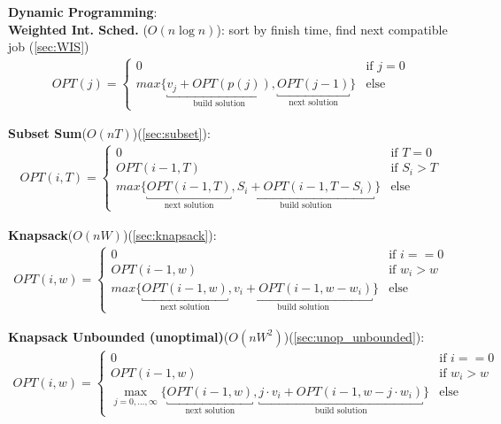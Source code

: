 \newpage 

\noindent
\textbf{Dynamic Programming}:\\

\noindent
\textbf{Weighted Int. Sched.} ($O(n\log n)$): sort by finish time, find next compatible job (\ref{sec:WIS})\\
 \begin{align*}
     OPT(j) =
    \begin{cases}
        0 & \text{if $j=0$}\\
        max\{\underbracket{v_j+OPT(p(j))}_{\text{build solution}}, \underbracket{OPT(j-1)}_{\text{next solution}}\} & \text{else}
    \end{cases}
\end{align*}

\noindent
\textbf{Subset Sum}($O(nT)$)(\ref{sec:subset}): 
\begin{align*}
    OPT(i, T) =
    \begin{cases}
        0 & \text{if $T=0$}\\
        OPT(i-1, T) & \text{if $S_i > T$}\\
        max\{\underbracket{OPT(i-1, T)}_{\text{next solution}}, \underbracket{S_i+OPT(i-1, T-S_i)}_{\text{build solution}}\} & \text{else}
    \end{cases}
\end{align*}

\noindent
\textbf{Knapsack}($O(nW)$)(\ref{sec:knapsack}):
\begin{align*}
    OPT(i, w) =
    \begin{cases}
        0 & \text{if $i==0$}\\
        OPT(i-1, w) & \text{if $w_i > w$}\\
        max\{\underbracket{OPT(i-1, w)}_{\text{next solution}}, \underbracket{v_i+OPT(i-1, w-w_i)}_{\text{build solution}}\} & \text{else}
    \end{cases}
\end{align*}

\noindent
\textbf{Knapsack Unbounded (unoptimal)}($O(nW^2)$)(\ref{sec:unop_unbounded}):
\begin{align*}
    OPT(i, w) =
    \begin{cases}
        0 & \text{if $i==0$}\\
        OPT(i-1, w) & \text{if $w_i > w$}\\
        {\displaystyle \max_{j = 0, \dots, \infty}}\{\underbracket{OPT(i-1, w)}_{\text{next solution}}, \underbracket{j\cdot v_i+OPT(i-1, w-j\cdot w_i)}_{\text{build solution}}\} & \text{else}
    \end{cases}
\end{align*}

